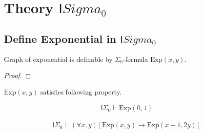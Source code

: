 \chapter{Theory $\mathsf{I}Sigma_0$}

\section{Define Exponential in $\mathsf{I}Sigma_0$}

\begin{theorem}[exponential]
  \label{LO.FirstOrder.Arith.Model.Exponential.defined}\leanok
  Graph of exponential is definable by $\Sigma_0$-formula $\mathrm{Exp}(x, y)$.
\end{theorem}
\begin{proof}\leanok

\end{proof}

$\mathrm{Exp}(x, y)$ satisfies following property.

\begin{lemma}[]\label{LO.FirstOrder.Arith.Model.Exponential.exponential_zero_one}
  \leanok

  \begin{align*}
    \mathsf{I}\Sigma_0 \vdash \mathrm{Exp}(0, 1)
  \end{align*}
\end{lemma}

\begin{lemma}[]\label{LO.FirstOrder.Arith.Model.Exponential.succ}
  \leanok
  
  \begin{align*}
    \mathsf{I}\Sigma_0 \vdash (\forall x, y)[\mathrm{Exp}(x, y) \to \mathrm{Exp}(x + 1, 2y)]
  \end{align*}
\end{lemma}